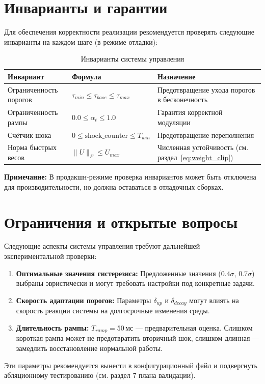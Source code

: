 \section{Инварианты и гарантии}

Для обеспечения корректности реализации рекомендуется проверять следующие инварианты на каждом шаге (в режиме отладки):

\begin{table}[h]
\centering
\caption{Инварианты системы управления}
\label{tab:invariants_control}
\begin{tabular}{lp{6cm}p{4cm}}
\toprule
\textbf{Инвариант} & \textbf{Формула} & \textbf{Назначение} \\
\midrule
Ограниченность порогов & $\tau_{min} \leq \tau_{base} \leq \tau_{max}$ & Предотвращение ухода порогов в бесконечность \\
Ограниченность рампы & $0.0 \leq \alpha_t \leq 1.0$ & Гарантия корректной модуляции \\
Счётчик шока & $0 \leq \text{shock\_counter} \leq T_{win}$ & Предотвращение переполнения \\
Норма быстрых весов & $\|U\|_F \leq U_{max}$ & Численная устойчивость (см. раздел~\ref{eq:weight_clip}) \\
\bottomrule
\end{tabular}
\end{table}

\textbf{Примечание:} В продакшн-режиме проверка инвариантов может быть отключена для производительности, но должна оставаться в отладочных сборках.

\section{Ограничения и открытые вопросы}

Следующие аспекты системы управления требуют дальнейшей экспериментальной проверки:

\begin{enumerate}
    \item \textbf{Оптимальные значения гистерезиса:} Предложенные значения ($0.4\sigma$, $0.7\sigma$) выбраны эвристически и могут требовать настройки под конкретные задачи.
    
    \item \textbf{Скорость адаптации порогов:} Параметры $\delta_{up}$ и $\delta_{decay}$ могут влиять на скорость реакции системы на долгосрочные изменения среды.
    
    \item \textbf{Длительность рампы:} $T_{ramp} = 50 \, \text{мс}$ — предварительная оценка. Слишком короткая рампа может не предотвратить вторичный шок, слишком длинная — замедлить восстановление нормальной работы.
\end{enumerate}

Эти параметры рекомендуется вынести в конфигурационный файл и подвергнуть абляционному тестированию (см. раздел 7 плана валидации).
